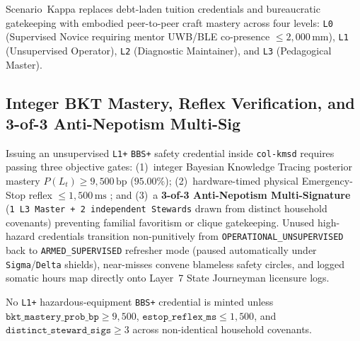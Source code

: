 Scenario~Kappa replaces debt-laden tuition credentials and bureaucratic gatekeeping with embodied
peer-to-peer craft mastery \parencite{corbett1995bkt,illich1973} across four levels: \texttt{L0}
(Supervised Novice requiring mentor UWB/BLE co-presence $\le 2{,}000\,\mathrm{mm}$), \texttt{L1}
(Unsupervised Operator), \texttt{L2} (Diagnostic Maintainer), and \texttt{L3} (Pedagogical Master).

\subsection{Integer BKT Mastery, Reflex Verification, and 3-of-3 Anti-Nepotism Multi-Sig}

Issuing an unsupervised \texttt{L1+} \texttt{BBS+} safety credential inside \texttt{col-kmsd}
requires passing three objective gates: (1)~integer Bayesian Knowledge Tracing posterior mastery
$P(L_t) \ge 9{,}500\,\mathrm{bp}$ ($95.00\%$); (2)~hardware-timed physical Emergency-Stop reflex
$\le 1{,}500\,\mathrm{ms}$ \parencite{iec61508}; and (3)~a \textbf{3-of-3 Anti-Nepotism Multi-Signature}
(\texttt{1 L3 Master + 2 independent Stewards} drawn from distinct household covenants) preventing
familial favoritism or clique gatekeeping. Unused high-hazard credentials transition non-punitively
from \texttt{OPERATIONAL\_UNSUPERVISED} back to \texttt{ARMED\_SUPERVISED} refresher mode (paused
automatically under \texttt{Sigma}/\texttt{Delta} shields), near-misses convene blameless safety
circles, and logged somatic hours map directly onto Layer~7 State Journeyman licensure logs.

\begin{invariant}
\label{inv:wavec-kappa-mastery}
No \texttt{L1+} hazardous-equipment \texttt{BBS+} credential is minted unless
$\mathtt{bkt\_mastery\_prob\_bp} \ge 9{,}500$, $\mathtt{estop\_reflex\_ms} \le 1{,}500$, and
$\mathtt{distinct\_steward\_sigs} \ge 3$ across non-identical household covenants.
\end{invariant}

